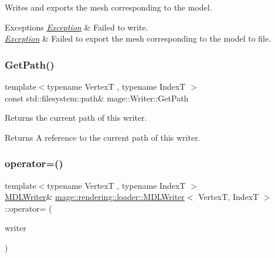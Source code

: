 Writes and exports the mesh corresponding to the model.


\begin{DoxyExceptions}{Exceptions}
{\em \mbox{\hyperlink{classmage_1_1_exception}{Exception}}} & Failed to write. \\
\hline
{\em \mbox{\hyperlink{classmage_1_1_exception}{Exception}}} & Failed to export the mesh corresponding to the model to file. \\
\hline
\end{DoxyExceptions}
\mbox{\label{classmage_1_1rendering_1_1loader_1_1_m_d_l_writer_ab023ae8174132f233c6e1fa4d3a2a1c8}} 
\subsubsection{\texorpdfstring{Get\+Path()}{GetPath()}}
{\footnotesize\ttfamily template$<$typename VertexT , typename IndexT $>$ \\
const std\+::filesystem\+::path\& mage\+::\+Writer\+::\+Get\+Path\hspace{0.3cm}{\ttfamily [noexcept]}}

Returns the current path of this writer.

\begin{DoxyReturn}{Returns}
A reference to the current path of this writer. 
\end{DoxyReturn}
\mbox{\label{classmage_1_1rendering_1_1loader_1_1_m_d_l_writer_a9e5f38a8b5016534385039d44d3d71dc}} 
\subsubsection{\texorpdfstring{operator=()}{operator=()}\hspace{0.1cm}{\footnotesize\ttfamily [1/2]}}
{\footnotesize\ttfamily template$<$typename VertexT , typename IndexT $>$ \\
\mbox{\hyperlink{classmage_1_1rendering_1_1loader_1_1_m_d_l_writer}{M\+D\+L\+Writer}}\& \mbox{\hyperlink{classmage_1_1rendering_1_1loader_1_1_m_d_l_writer}{mage\+::rendering\+::loader\+::\+M\+D\+L\+Writer}}$<$ VertexT, IndexT $>$\+::operator= (\begin{DoxyParamCaption}\item[{const \mbox{\hyperlink{classmage_1_1rendering_1_1loader_1_1_m_d_l_writer}{M\+D\+L\+Writer}}$<$ VertexT, IndexT $>$ \&}]{writer }\end{DoxyParamCaption})\hspace{0.3cm}{\ttfamily [delete]}}


